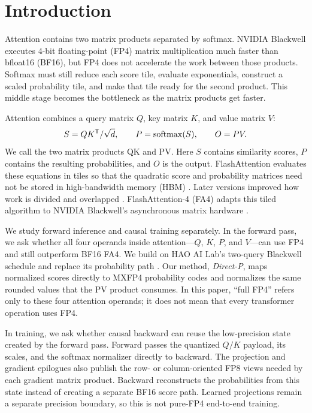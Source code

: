 \section{Introduction}

Attention contains two matrix products separated by softmax.  NVIDIA
Blackwell executes 4-bit floating-point (FP4) matrix multiplication much
faster than bfloat16 (BF16), but FP4 does not accelerate the work between
those products.  Softmax must still reduce each score tile, evaluate
exponentials, construct a scaled probability tile, and make that tile ready
for the second product.  This middle stage becomes the bottleneck as the
matrix products get faster.

Attention combines a query matrix $Q$, key matrix $K$, and value matrix $V$:
\begin{equation}
  S=QK^\mathsf{T}/\sqrt d,\qquad
  P=\operatorname{softmax}(S),\qquad
  O=PV.
  \label{eq:attention-intro}
\end{equation}
We call the two matrix products QK and PV.  Here $S$ contains similarity
scores, $P$ contains the resulting probabilities, and $O$ is the output.
FlashAttention evaluates these equations in tiles so that the quadratic score
and probability matrices need not be stored in high-bandwidth memory (HBM)
\cite{dao2022flashattention}.  Later versions improved how work is divided and
overlapped \cite{dao2023flashattention2,shah2024flashattention3}.
FlashAttention-4 (FA4) adapts this tiled algorithm to NVIDIA Blackwell's
asynchronous matrix hardware \cite{zadouri2026flashattention4}.

We study forward inference and causal training separately.  In the forward
pass, we ask whether all four operands inside attention---$Q$, $K$, $P$, and
$V$---can use FP4 and still outperform BF16 FA4.  We build on HAO AI Lab's
two-query Blackwell schedule and replace its probability path
\cite{hao2026fp4flashattention,zhang2026attnqat}.  Our method, \emph{Direct-P},
maps normalized scores directly to MXFP4 probability codes and normalizes the
same rounded values that the PV product consumes.  In this paper, ``full FP4''
refers only to these four attention operands; it does not mean that every
transformer operation uses FP4.

In training, we ask whether causal backward can reuse the low-precision state
created by the forward pass.  Forward passes the quantized $Q/K$ payload,
its scales, and the softmax normalizer directly to backward.  The projection
and gradient epilogues also publish the row- or column-oriented FP8 views
needed by each gradient matrix product.  Backward reconstructs the
probabilities from this state instead of creating a separate BF16 score path.
Learned projections remain a separate precision boundary, so this is not
pure-FP4 end-to-end training.

